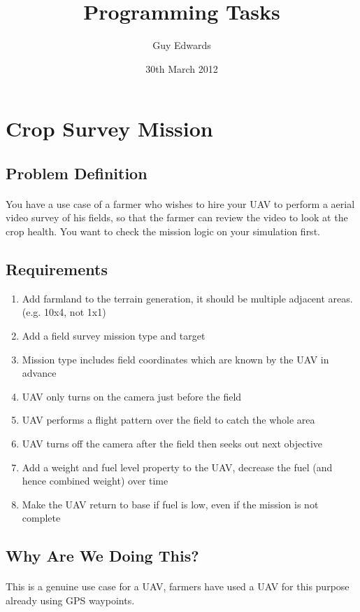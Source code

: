 \documentclass[11pt]{book}
\title{\textbf{Programming Tasks}}
\author{Guy Edwards}
\date{30th March 2012}
\begin{document}
\section{Crop Survey Mission}

\subsection{Problem Definition}

\paragraph{} You have a use case of a farmer who wishes to hire your UAV to perform a aerial video survey of his fields, so that the farmer can review the video to look at the crop health. You want to check the mission logic on your simulation first.

\subsection{Requirements}

\begin{enumerate}
\item Add farmland to the terrain generation, it should be multiple adjacent areas. (e.g. 10x4, not 1x1)
\item Add a field survey mission type and target
\item Mission type includes field coordinates which are known by the UAV in advance
\item UAV only turns on the camera just before the field
\item UAV performs a flight pattern over the field to catch the whole area
\item UAV turns off the camera after the field then seeks out next objective
\item Add a weight and fuel level property to the UAV, decrease the fuel (and hence combined weight) over time
\item Make the UAV return to base if fuel is low, even if the mission is not complete
\end{enumerate}

\subsection{Why Are We Doing This?}

\paragraph{} This is a genuine use case for a UAV, farmers have used a UAV for this purpose already using GPS waypoints.
\end{document}
